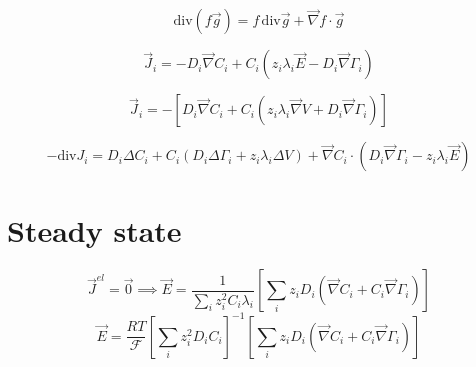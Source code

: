 \documentclass[aps,12pt]{revtex4}
\begin{document}
\begin{equation}
	\mathrm{div}(f\vec{g}) = f \, \mathrm{div}\vec{g} + \vec{\nabla} f \cdot \vec{g}
\end{equation}

\begin{equation}
	\vec{J}_i = -D_i \vec{\nabla} C_i + C_i \left( z_i \lambda_i \vec{E} - D_i \vec{\nabla}\Gamma_i \right)
\end{equation}

\begin{equation}
	\vec{J}_i = - \left[ D_i \vec{\nabla} C_i + C_i \left( z_i \lambda_i \vec{\nabla} V + D_i \vec{\nabla}\Gamma_i \right) \right]
\end{equation}

\begin{equation}
	-\mathrm{div} J_i = D_i \Delta C_i + C_i \left( D_i \Delta \Gamma_i + z_i \lambda_i \Delta V \right)
	+ \vec{\nabla} C_i \cdot \left(  D_i \vec{\nabla}\Gamma_i - z_i \lambda_i \vec{E} \right) 
\end{equation}

\section{Steady state}

\begin{equation}
\vec{J}^{el} = \vec{0} \implies \vec{E} = \dfrac{1}{ \sum_i z_i^2 C_i \lambda_i } \left[\sum_i  z_i D_i \left( \vec{\nabla} C_i + C_i \vec{\nabla}\Gamma_i \right)\right]
\end{equation}
\begin{equation}
	\vec{E} = \dfrac{RT}{\mathcal{F}} \left[\sum_i z_i^2 D_i C_i \right]^{-1} 
	\left[\sum_i  z_i D_i \left( \vec{\nabla} C_i + C_i \vec{\nabla}\Gamma_i \right)\right]
\end{equation}
\end{document}
